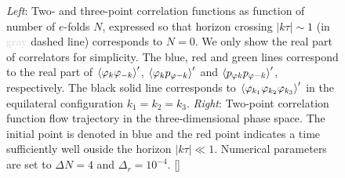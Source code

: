 \documentclass[11pt]{article}
\numberwithin{equation}{section} %
\begin{document}
\begin{figure}[h!]
  \centering
  \hspace*{0.2cm}
  \vspace*{0.2cm}
  \caption{\textit{Left}: Two- and three-point correlation functions as function of number of $e$-folds $N$, expressed so that horizon crossing $|k\tau|\sim 1$ (in \textcolor{lightgray}{gray} dashed line) corresponds to $N=0$. We only show the real part of correlators for simplicity. The \textcolor{pyblue}{blue}, \textcolor{pyred}{red} and \textcolor{pygreen}{green} lines correspond to the real part of $\braket{\varphi_{k} \varphi_{-k}}'$, $\braket{\varphi_{k} p_{\varphi -k}}'$ and $\braket{p_{\varphi k} p_{\varphi -k}}'$, respectively. The black solid line corresponds to $\braket{\varphi_{k_1} \varphi_{k_2} \varphi_{k_3}}'$ in the equilateral configuration $k_1=k_2=k_3$. \textit{Right}: Two-point correlation function flow trajectory in the three-dimensional phase space. The initial point is denoted in \textcolor{pyblue}{blue} and the \textcolor{pyred}{red} point indicates a time sufficiently well ouside the horizon $|k\tau| \ll 1$. Numerical parameters are set to $\Delta N = 4$ and $\Delta_r = 10^{-4}$. [\href{https://github.com/deniswerth/CosmoFlow/blob/main/CosmoFlow/Massless_dphi3/MyFirstRun.ipynb}{\faGithub}]}
  \label{fig: Masslessdphi3 time evolution}
\end{figure}
\end{document}

